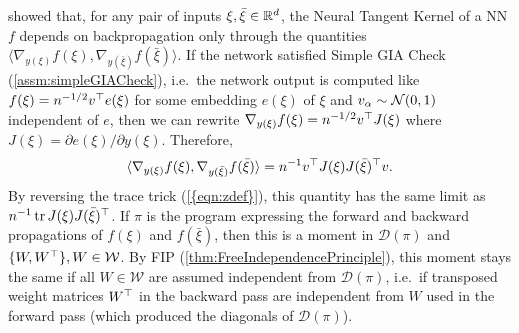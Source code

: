 \documentclass[main.tex]{subfiles}
\begin{document}
\citet{yangTP2} showed that, for any pair of inputs $\xi, \bar \xi \in \mathbb{R}^d$, the Neural Tangent Kernel of a NN $f$ depends on backpropagation only through the quantities $\langle {\nabla_{ y(\xi)} f(\xi)}, {\nabla_{ y(\bar \xi)} f(\bar \xi)} \rangle$.
If the network satisfied Simple GIA Check (\cref{assm:simpleGIACheck}), i.e.\ the network output is computed like $f(\xi) = n^{-1/2} v^\top e(\xi)$ for some embedding $e(\xi)$ of $\xi$ and $v_\alpha \sim\mathcal{N}(0, 1)$ independent of $e$, then we can rewrite ${\nabla_{ y(\xi)} f(\xi)} = n^{-1/2} v^\top J(\xi)$ where $J(\xi) = \partial e(\xi)/\partial y(\xi)$.
Therefore,
\begin{align*}
  \langle {\nabla_{ y(\xi)} f(\xi)}, {\nabla_{ y(\bar \xi)} f(\bar \xi)} \rangle
  = {n}^{-1} v^\top J(\xi) J(\bar\xi)^\top v.
\end{align*}
By reversing the trace trick (\cref{{eqn:zdef}}), this quantity has the same limit as ${n}^{-1} \operatorname{tr} J(\xi) J(\bar\xi)^\top$.
If $\pi$ is the program expressing the forward and backward propagations of $f(\xi)$ and $f(\bar \xi)$, then this is a moment in $\mathcal D(\pi)$ and $\{W, W^\top\}, W \in \mathcal W$.
By FIP (\cref{thm:FreeIndependencePrinciple}), this moment stays the same if all $W \in \mathcal W$ are assumed independent from $\mathcal D(\pi)$, i.e.\ if transposed weight matrices $W^\top$ in the backward pass are independent from $W$ used in the forward pass (which produced the diagonals of $\mathcal D(\pi)$).
\end{document}
